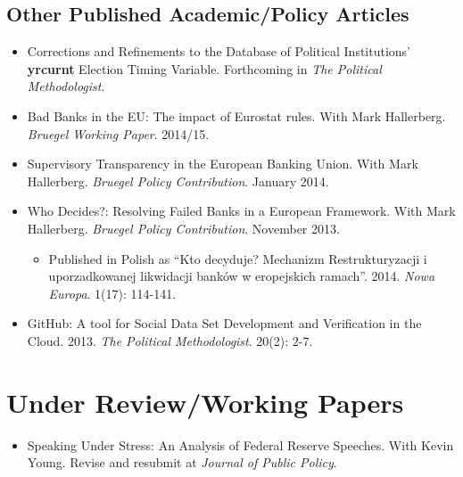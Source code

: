 \documentclass[a4paper]{article}
\begin{document}
{{\begin{itemize}
\end{itemize}

\subsection*{Other Published Academic/Policy Articles}

\begin{itemize}

    \item Corrections and Refinements to the Database of Political Institutions' \textbf{yrcurnt} Election Timing Variable. Forthcoming in {\emph{The Political Methodologist}}.

    \item Bad Banks in the EU: The impact of Eurostat rules. With Mark Hallerberg. \emph{Bruegel Working Paper}. 2014/15.

    \item Supervisory Transparency in the European Banking Union. With Mark Hallerberg. {\emph{Bruegel Policy Contribution}}. January 2014.

    \item Who Decides?: Resolving Failed Banks in a European Framework. With Mark Hallerberg. {\emph{Bruegel Policy Contribution}}. November 2013.

      \begin{itemize}
        \item Published in Polish as ``Kto decyduje? Mechanizm Restrukturyzacji i uporzadkowanej likwidacji bank\'{o}w w eropejskich ramach''. 2014. \emph{Nowa Europa}. 1(17): 114-141.
      \end{itemize}

    \item GitHub: A tool for Social Data Set Development and Verification in the Cloud. 2013. {\emph{The Political Methodologist}}. 20(2): 2-7.

\end{itemize}


\section*{Under Review/Working Papers}

\begin{itemize}

    \item Speaking Under Stress: An Analysis of Federal Reserve Speeches. With Kevin Young. Revise and resubmit at \emph{Journal of Public Policy}.


\end{itemize}}}
\end{document}

